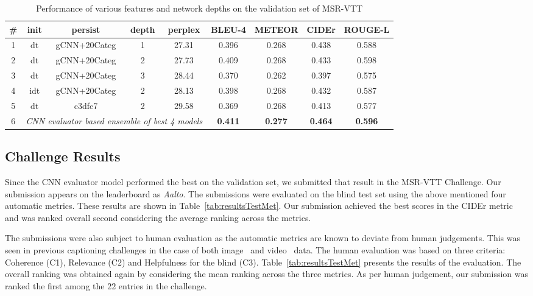 \begin{table}[thp]
  \caption{Performance of various features and 
    network depths on the validation set of MSR-VTT}
  \newcommand{\modpar}[4]{%
    \multirow{2}{*}{\emph{#1}} & \multirow{2}{*}{#2} & \multirow{2}{*}{#3}
    & \multirow{2}{*}{#4}}
  \centering
  \newcommand{\bs}{\small\bf}
  \begin{tabular}{||c|c|c|c|c|c|c|c|c|}
    \hline\hline
    \bf\# &\bf init &\bf persist &\bf depth &\bf perplex &\bs BLEU-4 &\bs METEOR &\bs CIDEr &\bs ROUGE-L \\\hline\hline
    1 & dt  & gCNN+20Categ & 1  & 27.31 & 0.396 & 0.268 & 0.438 & 0.588 \\
    2 & dt  & gCNN+20Categ & 2  & 27.73 & 0.409 & 0.268 & 0.433 & 0.598 \\
    3 & dt  & gCNN+20Categ & 3  & 28.44 & 0.370 & 0.262 & 0.397 & 0.575 \\\hline
    4 & idt & gCNN+20Categ & 2  & 28.13 & 0.398 & 0.268 & 0.432 & 0.587 \\
    5 & dt  & c3dfc7       & 2  & 29.58 & 0.369 & 0.268 & 0.413 & 0.577 \\\hline
    6 & \multicolumn{4}{c|}{\em CNN evaluator based ensemble of best 4 models}
                                  & \bf0.411 & \bf0.277 & \bf0.464 & \bf0.596 \\\hline
    \hline
  \end{tabular}
  \label{tab:resultsVal}
\end{table}


\subsection{Challenge Results}

Since the CNN evaluator model performed the best on the validation set, we
submitted that result in the MSR-VTT Challenge.
Our submission appears on the leaderboard as \emph{Aalto}.
The submissions were evaluated on the blind test set using the above mentioned
four automatic metrics.
These results are shown in Table~\ref{tab:resultsTestMet}.
Our submission achieved the best scores in the CIDEr metric and was ranked
overall second considering the average ranking across the metrics.

The submissions were also subject to human evaluation as the automatic metrics
are known to deviate from human judgements.
This was seen in previous captioning challenges in the case of both
image~\cite{CocoChallengeSlides} and
video~\cite{DBLP:journals/corr/RohrbachTRTPLCS16} data.
The human evaluation was based on three criteria: Coherence (C1), Relevance (C2)
and Helpfulness for the blind (C3).
Table~\ref{tab:resultsTestMet} presents the results of the evaluation.
The overall ranking was obtained again by considering the mean ranking across
the three metrics.
As per human judgement, our submission was ranked the first among the 22 entries
in the challenge.

